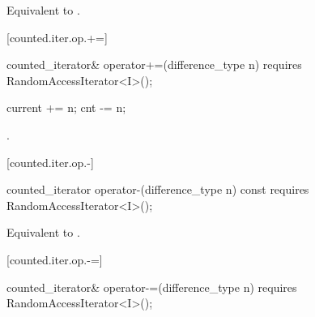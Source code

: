 \begin{addedblock}
\begin{itemdescr}
\pnum
\requires {}

\pnum
\effects Equivalent to
.
\end{itemdescr}

[counted.iter.op.+=]{}

%
%
\begin{itemdecl}
  counted_iterator& operator+=(difference_type n)
    requires RandomAccessIterator<I>();
\end{itemdecl}

\begin{itemdescr}
\pnum
\requires {}

\pnum
\effects
\begin{codeblock}
current += n;
cnt -= n;
\end{codeblock}

\pnum
\returns {}.
\end{itemdescr}

[counted.iter.op.-]{}

%
%
\begin{itemdecl}
  counted_iterator operator-(difference_type n) const
    requires RandomAccessIterator<I>();
\end{itemdecl}

\begin{itemdescr}
\pnum
\requires {}

\pnum
\effects Equivalent to
.
\end{itemdescr}

[counted.iter.op.-=]{}

%
%
\begin{itemdecl}
  counted_iterator& operator-=(difference_type n)
    requires RandomAccessIterator<I>();
\end{itemdecl}

\begin{itemdescr}
\pnum
\requires {}


\end{itemdescr}
\end{addedblock}
